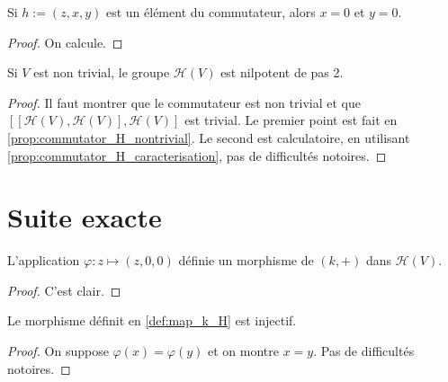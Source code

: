 \begin{proposition}
        \label{prop:commutator_H_caracterisation}
        \leanok
    
        Si $h:=(z,x,y)$ est un élément du commutateur, alors $x=0$ et $y=0$.
    \begin{proof}
        \leanok
        On calcule.
    \end{proof}
\end{proposition}

\begin{theorem}
    \label{thm:two_step_nil}
    \leanok

    Si $V$ est non trivial, le groupe $\mathcal{H}(V)$ est nilpotent de pas 2.
    \begin{proof}
        \leanok
        Il faut montrer que le commutateur est non trivial et que $[[\mathcal{H}(V),\mathcal{H}(V)],\mathcal{H}(V)]$
        est trivial. Le premier point est fait en \ref{prop:commutator_H_nontrivial}.
        Le second est calculatoire, en utilisant \ref{prop:commutator_H_caracterisation}, pas de difficultés notoires.
    \end{proof}
\end{theorem}

\section{Suite exacte}

\begin{definition}
    \label{def:map_k_H}
    \leanok 

    L'application $\varphi:z\mapsto (z,0,0)$ définie un morphisme de 
    $(k,+)$ dans $\mathcal{H}(V)$.
    \begin{proof}
        \leanok
        C'est clair.
    \end{proof}
\end{definition}

\begin{proposition}[]
    \label{prop:inj_map_k_H}
    \leanok 

    Le morphisme définit en \ref{def:map_k_H} est injectif.
    \begin{proof}
        \leanok
        On suppose $\varphi(x)=\varphi(y)$ et on montre $x=y$. Pas de 
        difficultés notoires.
    \end{proof}
\end{proposition}

